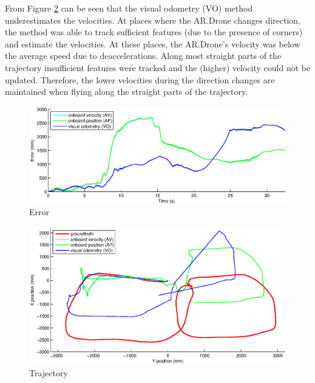 From Figure \ref{fig:exp1-notexture-path} can be seen that the visual odometry (VO) method underestimates the velocities.
At places where the AR.Drone changes direction, the method was able to track sufficient features (due to the presence of corners) and estimate the velocities.
At these places, the AR.Drone's velocity was below the average speed due to deaccelerations.
Along most straight parts of the trajectory insufficient features were tracked and the (higher) velocity could not be updated.
Therefore, the lower velocities during the direction changes are maintained when flying along the straight parts of the trajectory.


\begin{figure}[htb!]
\centering
\includegraphics[width=\linewidth]{images/exp1-run2-error.eps}
\caption{Error}
\label{fig:exp1-notexture-error}
\end{figure}

\begin{figure}[htb!]
\centering
\includegraphics[width=\linewidth]{images/exp1-run2-path.eps}
\caption{Trajectory}
\label{fig:exp1-notexture-path}
\end{figure}

